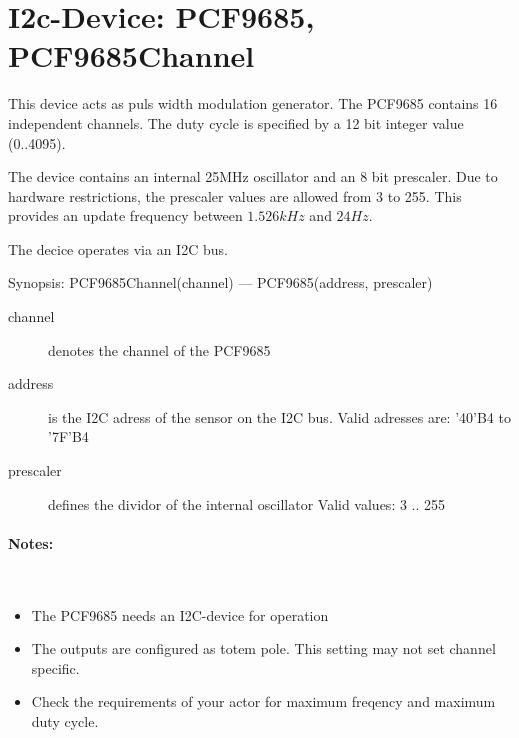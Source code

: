 \section{I2c-Device: PCF9685, PCF9685Channel}
This device acts as puls width modulation generator.
The PCF9685 contains 16 independent channels. The duty cycle
is specified by a 12 bit integer value (0..4095).

The device contains an internal 25MHz oscillator and an 8 bit
prescaler. Due to hardware restrictions, the prescaler values are
allowed from 3 to 255. This provides an update frequency between
$1.526 kHz$ and $24 Hz$.

The decice operates via an I2C bus. 

Synopsis: PCF9685Channel(channel) --- PCF9685(address, prescaler) \\

\begin{description}
\item[channel] denotes the channel of the PCF9685
\item[address] is the I2C adress of the sensor on the I2C bus.
   Valid adresses are: '40'B4 to '7F'B4
\item[prescaler] defines the dividor of the internal oscillator
   Valid values: 3 .. 255
\end{description}

\paragraph{Notes:}\ 
\begin{itemize}
\item The PCF9685 needs an I2C-device for operation
\item The outputs are configured as totem pole. This 
    setting may not set channel specific.
\item Check the requirements of your actor for maximum freqency
    and maximum duty cycle.
\end{itemize}

